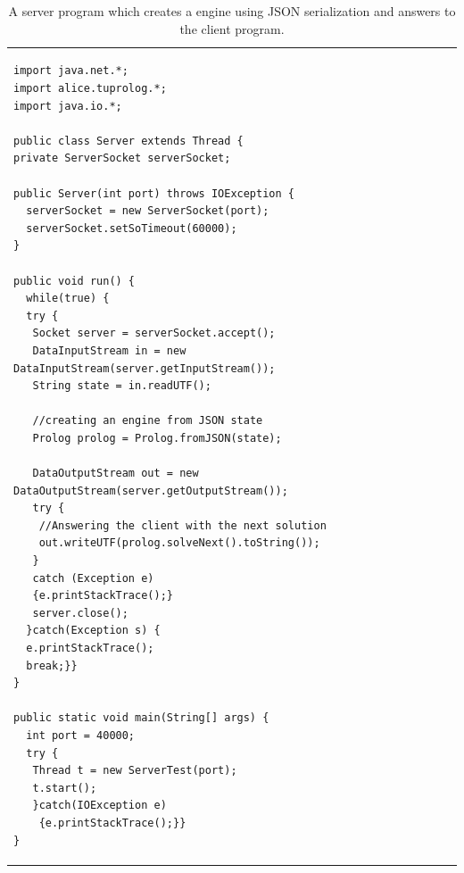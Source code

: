 \begin{table}
{\footnotesize
	\begin{tabular}[-1cm]{p{12cm}}
	\begin{verbatim}
import java.net.*;
import alice.tuprolog.*;
import java.io.*;

public class Server extends Thread {
private ServerSocket serverSocket;
	
public Server(int port) throws IOException {
  serverSocket = new ServerSocket(port);
  serverSocket.setSoTimeout(60000);
}
	
public void run() {
  while(true) {
  try {
   Socket server = serverSocket.accept();
   DataInputStream in = new DataInputStream(server.getInputStream());
   String state = in.readUTF();

   //creating an engine from JSON state
   Prolog prolog = Prolog.fromJSON(state);
				
   DataOutputStream out = new DataOutputStream(server.getOutputStream());
   try {
   	//Answering the client with the next solution
    out.writeUTF(prolog.solveNext().toString());
   } 
   catch (Exception e) 
   {e.printStackTrace();}
   server.close();
  }catch(Exception s) {
  e.printStackTrace();
  break;}}
}

public static void main(String[] args) {
  int port = 40000;
  try {
   Thread t = new ServerTest(port);
   t.start();
   }catch(IOException e)
    {e.printStackTrace();}}
}
\end{verbatim}
\end{tabular}
\caption{A server program which creates a \tuprolog{} engine using JSON serialization and answers to the client program.}
}
\end{table} 
